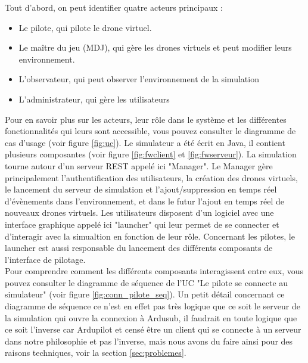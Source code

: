\documentclass{scrartcl}
\begin{document}
Tout d'abord, on peut identifier quatre acteurs principaux :
\begin{itemize}
    \item Le pilote, qui pilote le drone virtuel.
    \item Le maître du jeu (MDJ), qui gère les drones virtuels et peut modifier leurs environnement.
    \item L'observateur, qui peut observer l'environnement de la simulation
    \item L'administrateur, qui gère les utilisateurs
\end{itemize}

Pour en savoir plus sur les acteurs, leur rôle dans le système et les différentes fonctionnalités qui leurs sont accessible, vous pouvez consulter le diagramme de cas d'usage (voir figure \ref{fig:uc}).
Le simulateur a été écrit en Java, il contient plusieurs composantes (voir figure \ref{fig:fwclient} et \ref{fig:fwserveur}).
La simulation tourne autour d'un serveur REST appelé ici "Manager".
Le Manager gère principalement l'authentification des utilisateurs, la création des drones virtuels, le lancement du serveur de simulation
et l'ajout/suppression en temps réel d'évènements dans l'environnement, et dans le futur l'ajout en temps réel de nouveaux drones virtuels.
Les utilisateurs disposent d'un logiciel avec une interface graphique appelé ici "launcher" qui leur permet de se connecter et d'interagir avec la simualtion
en fonction de leur rôle. Concernant les pilotes, le launcher est aussi responsable du lancement des différents composants de l'interface de pilotage.
\\
Pour comprendre comment les différents composants interagissent entre eux, vous pouvez consulter le diagramme de séquence
de l'UC "Le pilote se connecte au simulateur" (voir figure \ref{fig:conn_pilote_seq}).
Un petit détail concernant ce diagramme de séquence ce n'est en effet pas très logique que ce soit le serveur de la simulation qui ouvre la connexion à Ardusub, il faudrait en toute logique
que ce soit l'inverse car Ardupilot et censé être un client qui se connecte à un serveur dans notre philosophie et pas l'inverse, mais
nous avons du faire ainsi pour des raisons techniques, voir la section \ref{sec:problemes}.\\
\end{document}
